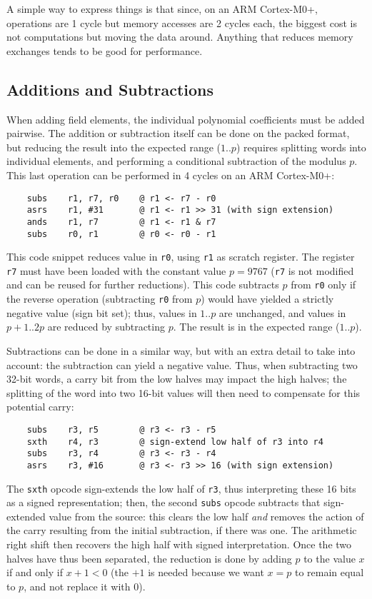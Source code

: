 \documentclass{llncs}
\begin{document}
A simple way to express things is that since, on an ARM Cortex-M0+,
operations are 1 cycle but memory accesses are 2 cycles each, the
biggest cost is not computations but moving the data around. Anything
that reduces memory exchanges tends to be good for performance.

\subsection{Additions and Subtractions}\label{sec:field-ops-add}

When adding field elements, the individual polynomial coefficients must
be added pairwise. The addition or subtraction itself can be done on the
packed format, but reducing the result into the expected range
($1$..$p$) requires splitting words into individual elements, and
performing a conditional subtraction of the modulus $p$. This last
operation can be performed in 4 cycles on an ARM Cortex-M0+:
\begin{verbatim}
    subs    r1, r7, r0    @ r1 <- r7 - r0
    asrs    r1, #31       @ r1 <- r1 >> 31 (with sign extension)
    ands    r1, r7        @ r1 <- r1 & r7
    subs    r0, r1        @ r0 <- r0 - r1
\end{verbatim}
This code snippet reduces value in \verb+r0+, using \verb+r1+ as
scratch register. The register \verb+r7+ must have been loaded with
the constant value $p = 9767$ (\verb+r7+ is not modified and can be
reused for further reductions). This code subtracts $p$ from \verb+r0+
only if the reverse operation (subtracting \verb+r0+ from $p$) would
have yielded a strictly negative value (sign bit set); thus, values
in $1$..$p$ are unchanged, and values in $p+1$..$2p$ are reduced by
subtracting $p$. The result is in the expected range ($1$..$p$).

Subtractions can be done in a similar way, but with an extra detail to
take into account: the subtraction can yield a negative value. Thus,
when subtracting two 32-bit words, a carry bit from the low halves may
impact the high halves; the splitting of the word into two 16-bit
values will then need to compensate for this potential carry:
\begin{verbatim}
    subs    r3, r5        @ r3 <- r3 - r5
    sxth    r4, r3        @ sign-extend low half of r3 into r4
    subs    r3, r4        @ r3 <- r3 - r4
    asrs    r3, #16       @ r3 <- r3 >> 16 (with sign extension)
\end{verbatim}
The \verb+sxth+ opcode sign-extends the low half of \verb+r3+, thus
interpreting these 16 bits as a signed representation; then, the
second \verb+subs+ opcode subtracts that sign-extended value from the
source: this clears the low half \emph{and} removes the action of the
carry resulting from the initial subtraction, if there was one. The
arithmetic right shift then recovers the high half with signed
interpretation. Once the two halves have thus been separated, the
reduction is done by adding $p$ to the value $x$ if and only if
$x+1 < 0$ (the $+1$ is needed because we want $x = p$ to remain equal
to $p$, and not replace it with 0).
\end{document}

